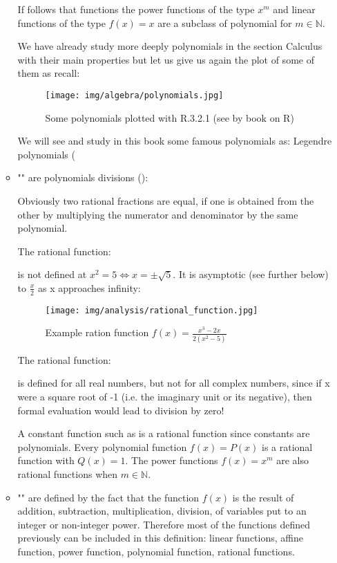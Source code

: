 \begin{enumerate}
\begin{itemize}
			If follows that functions the power functions of the type $x^m$ and linear functions of the type $f(x)=x$ are a subclass of polynomial for $m\in \mathbb{N}$.
			
			We have already study more deeply polynomials in the section Calculus with their main properties but let us give us again the plot of some of them as recall: 
			\begin{figure}[H]
				\centering
				\texttt{[image: img/algebra/polynomials.jpg]}
				\caption{Some polynomials plotted with R.3.2.1 (see by book on R)}
			\end{figure}
			We will see and study in this book some famous polynomials as: Legendre polynomials (
			
			\item "" are polynomials divisions ():
			
			\begin{tcolorbox}[title=Remark,colframe=black,arc=10pt]
			Obviously two rational fractions are equal, if one is obtained from the other by multiplying the numerator and denominator by the same polynomial.
			\end{tcolorbox}
			The rational function:
			
			is not defined at $x^2=5 \Leftrightarrow x=\pm \sqrt{5}$. It is asymptotic (see further below) to $\frac{x}{2}$ as x approaches infinity:
			\begin{figure}[H]
				\centering
				\texttt{[image: img/analysis/rational\_function.jpg]}
				\caption{Example ration function $f(x) = \frac{x^3-2x}{2(x^2-5)}$}
			\end{figure}
			The rational function:
			
			 is defined for all real numbers, but not for all complex numbers, since if x were a square root of -1 (i.e. the imaginary unit or its negative), then formal evaluation would lead to division by zero!
			 
			 A constant function such as is a rational function since constants are polynomials. Every polynomial function $f(x) = P(x)$ is a rational function with $Q(x) = 1$. The power functions $f(x)=x^m$ are also rational functions when $m\in\mathbb{N}$.
			 
			 \item "" are defined by the fact that the function $f(x)$ is the result of addition, subtraction, multiplication, division, of variables put to an integer or non-integer power. Therefore most of the functions defined previously can be included in this definition: linear functions, affine function, power function, polynomial function, rational functions.
			 

\end{itemize}
\end{enumerate}
